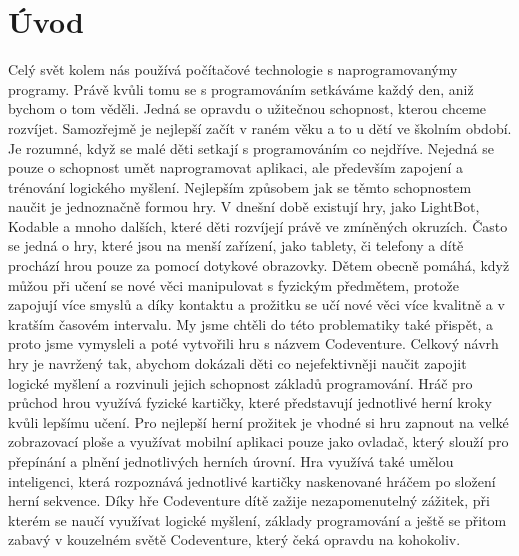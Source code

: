 \chapter{Úvod}

Celý svět kolem nás používá počítačové technologie s naprogramovanýmy programy. Právě kvůli tomu se s programováním setkáváme každý den, aniž bychom o tom věděli. Jedná se opravdu o užitečnou schopnost, kterou chceme rozvíjet. Samozřejmě je nejlepší začít v raném věku a to u dětí ve školním období. Je rozumné, když se malé děti setkají s programováním co nejdříve. Nejedná se pouze o schopnost umět naprogramovat aplikaci, ale především zapojení a trénování logického myšlení. Nejlepším způsobem jak se těmto schopnostem naučit je jednoznačně formou hry. V dnešní době existují hry, jako LightBot, Kodable a mnoho dalších, které děti rozvíjejí právě ve zmíněných okruzích. Často se jedná o hry, které jsou na menší zařízení, jako tablety, či telefony a dítě prochází hrou pouze za pomocí dotykové obrazovky. Dětem obecně pomáhá, když můžou při učení se nové věci manipulovat s fyzickým předmětem, protože zapojují více smyslů a díky kontaktu a prožitku se učí nové věci více kvalitně a v kratším časovém intervalu. My jsme chtěli do této problematiky také přispět, a proto jsme vymysleli a poté vytvořili hru s názvem Codeventure. Celkový návrh hry je navržený tak, abychom dokázali děti co nejefektivněji naučit zapojit logické myšlení a rozvinuli jejich schopnost základů programování. Hráč pro průchod hrou využívá fyzické kartičky, které představují jednotlivé herní kroky kvůli lepšímu učení. Pro nejlepší herní prožitek je vhodné si hru zapnout na velké zobrazovací ploše a využívat mobilní aplikaci pouze jako ovladač, který slouží pro přepínání a plnění jednotlivých herních úrovní. Hra využívá také umělou inteligenci, která rozpoznává jednotlivé kartičky naskenované hráčem po složení herní sekvence. Díky hře Codeventure dítě zažije nezapomenutelný zážitek, při kterém se naučí využívat logické myšlení, základy programování a ještě se přitom zabavý v kouzelném světě Codeventure, který čeká opravdu na kohokoliv.